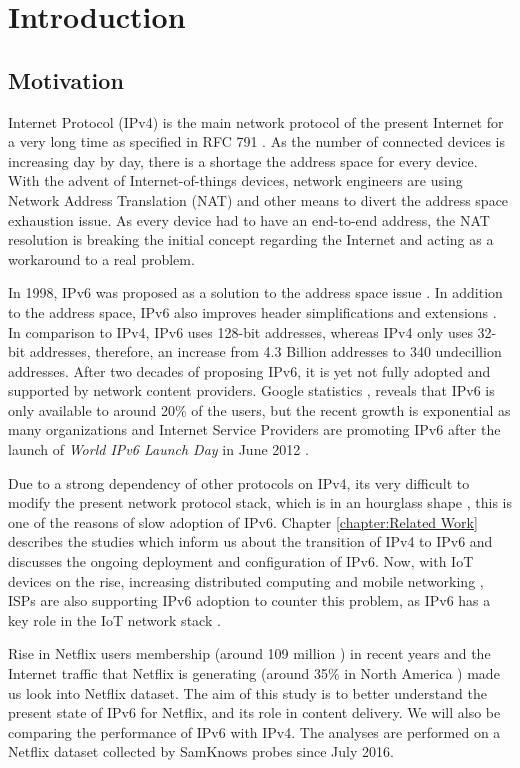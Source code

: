 \chapter{Introduction}\label{chapter:introduction}

\section{Motivation}

Internet Protocol (IPv4) is the main network protocol of the present Internet for a very long time as specified in RFC 791 \cite{rfc791}. As the number of connected devices is increasing day by day, there is a shortage the address space for every device.
With the advent of Internet-of-things devices, network engineers are using Network Address Translation (NAT) and other means to divert the address space exhaustion issue.
As every device had to have an end-to-end address, the NAT resolution is breaking the initial concept regarding the Internet and acting as a workaround to a real problem.

In 1998, IPv6 was proposed as a solution to the address space issue \cite{rfc2460}. In addition to the address space, IPv6 also improves header simplifications and extensions \cite{viet}.
In comparison to IPv4, IPv6 uses 128-bit addresses, whereas IPv4 only uses 32-bit addresses, therefore, an increase from 4.3 Billion addresses to 340 undecillion addresses. After two decades of proposing IPv6,
it is yet not fully adopted and supported by network content providers. Google statistics \cite{gv6}, reveals that IPv6 is only available to around 20\% of the users, but the recent growth is exponential as many organizations and Internet
Service Providers are promoting IPv6 after the launch of \textit{World IPv6 Launch Day} in June 2012 \cite{ipv6day}.

Due to a strong dependency of other protocols on IPv4, its very difficult to modify the present network protocol stack, which is in an hourglass shape \cite{hourglass}, this is one of the reasons of slow adoption of IPv6. 
Chapter \ref{chapter:Related Work} describes the studies which inform us about the transition of IPv4 to IPv6 and discusses the ongoing deployment and configuration of IPv6. Now, with IoT devices on the rise, increasing distributed computing and mobile networking \cite{iot},
ISPs are also supporting IPv6 adoption to counter this problem, as IPv6 has a key role in the IoT network stack \cite{iotipv6}.

Rise in Netflix users membership (around 109 million \cite{ninanetflix}) in recent years and the Internet traffic that Netflix is generating (around 35\% in North America \cite{sandvine}) made us look into Netflix dataset. 
The aim of this study is to better understand the present state of IPv6 for Netflix, and its role in content delivery. We will also be comparing the performance of IPv6 with IPv4. The analyses are performed on a Netflix dataset collected by SamKnows probes \cite{samknows} since July 2016. 

